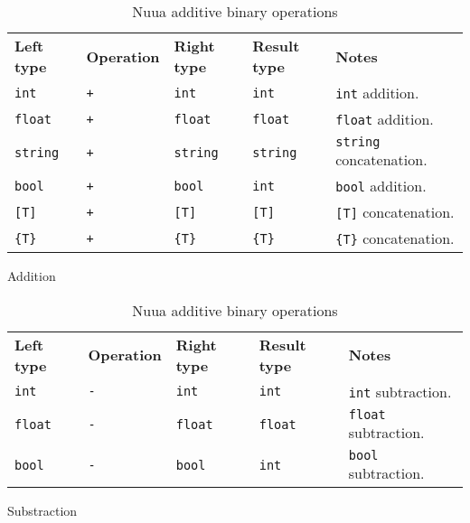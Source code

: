 \begin{table}[H]
	\centering
	\begin{subtable}{\textwidth}
		\centering
        \begin{tabular}{ l l l l p{9.5cm} }
            \textbf{Left type} & \textbf{Operation} & \textbf{Right type} & \textbf{Result type} & \textbf{Notes} \\
            \texttt{int} & \texttt{+} & \texttt{int} & \texttt{int} & \texttt{int} addition.\\
            \texttt{float} & \texttt{+} & \texttt{float} & \texttt{float} & \texttt{float} addition.\\
            \texttt{string} & \texttt{+} & \texttt{string} & \texttt{string} & \texttt{string} concatenation.\\
            \texttt{bool} & \texttt{+} & \texttt{bool} & \texttt{int} & \texttt{bool} addition.\\
            \texttt{[T]} & \texttt{+} & \texttt{[T]} & \texttt{[T]} & \texttt{[T]} concatenation.\\
            \texttt{\{T\}} & \texttt{+} & \texttt{\{T\}} & \texttt{\{T\}} & \texttt{\{T\}} concatenation.\\
		\end{tabular}
		\caption{Addition}
	\end{subtable}
	\begin{subtable}{\textwidth}
		\centering
        \begin{tabular}{ l l l l p{9.5cm} }
            \textbf{Left type} & \textbf{Operation} & \textbf{Right type} & \textbf{Result type} & \textbf{Notes} \\
            \texttt{int} & \texttt{-} & \texttt{int} & \texttt{int} & \texttt{int} subtraction.\\
            \texttt{float} & \texttt{-} & \texttt{float} & \texttt{float} & \texttt{float} subtraction.\\
            \texttt{bool} & \texttt{-} & \texttt{bool} & \texttt{int} & \texttt{bool} subtraction.\\
		\end{tabular}
		\caption{Substraction}
	\end{subtable}
	\caption{Nuua additive binary operations}
    \label{fig:nuua_additive_bin_ops}
\end{table}

